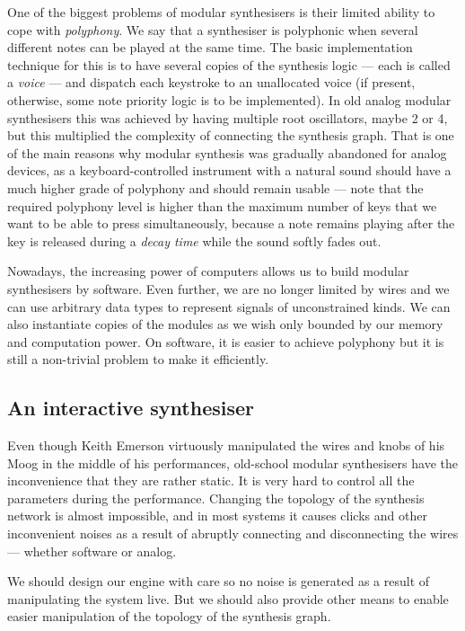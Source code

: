 One of the biggest problems of modular synthesisers is their limited
ability to cope with \emph{polyphony}. We say that a
synthesiser is polyphonic when several different notes can be played
at the same time. The basic implementation technique for this is to
have several copies of the synthesis logic --- each is called a
\emph{voice} --- and dispatch each keystroke to an
unallocated voice (if present, otherwise, some note priority logic is
to be implemented). In old analog modular synthesisers this was
achieved by having multiple root oscillators, maybe 2 or 4, but this
multiplied the complexity of connecting the synthesis graph. That is
one of the main reasons why modular synthesis was gradually abandoned
for analog devices, as a keyboard-controlled instrument with a natural
sound should have a much higher grade of polyphony and should remain
usable --- note that the required polyphony level is higher than the
maximum number of keys that we want to be able to press
simultaneously, because a note remains playing after the key is
released during a \emph{decay time} while the
sound softly fades out.

Nowadays, the increasing power of computers allows us to build modular
synthesisers by software. Even
further, we are no longer limited by wires and we can use arbitrary
data types to represent signals of unconstrained kinds. We can also
instantiate copies of the modules as we wish only bounded by our
memory and computation power. On software, it is easier to achieve
polyphony but it is still a non-trivial problem to make it
efficiently.

\subsection{An interactive synthesiser}

Even though Keith Emerson virtuously manipulated the wires and knobs
of his Moog in the middle of his performances,
old-school modular synthesisers have the inconvenience that they are
rather static. It is very hard to control all the parameters during
the performance. Changing the topology of the synthesis network is
almost impossible, and in most systems it causes clicks and other
inconvenient noises as a result of abruptly connecting and
disconnecting the wires --- whether software or analog.

We should design our engine with care so no noise is generated as a
result of manipulating the system live. But we should also provide
other means to enable easier manipulation of the
topology of the synthesis graph.

